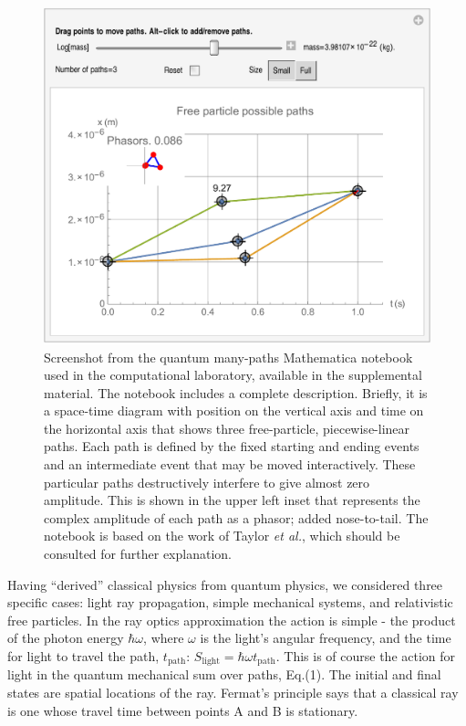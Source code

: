 \documentclass[prb,oncolumn,12pt]{revtex4-2}
\begin{document}
\begin{figure}[]
\includegraphics[width=14cm]{ActionCourseFigure.pdf}
\caption{Screenshot from the quantum many-paths Mathematica notebook used in the computational laboratory, available in the supplemental material. \cite{supplement} The notebook includes a complete description. Briefly, it is a space-time diagram with position on the vertical axis and time on the horizontal axis that shows three free-particle, piecewise-linear paths. Each path is defined by the fixed starting and ending events and an intermediate event that may be moved interactively. These particular paths destructively interfere to give almost zero amplitude. This is shown in the upper left inset that represents the complex amplitude of each path as a phasor; added nose-to-tail. The notebook is based on the work of Taylor \textit{et al.}, \cite{TaylorCIP} which should be consulted for further explanation. }
\label{destructive interference}
\end{figure}

Having ``derived'' classical physics from quantum physics, we considered three specific cases: light ray propagation, simple mechanical systems, and relativistic free particles. In the ray optics approximation the action is simple - the product of the photon energy $\hbar \omega$, where $\omega$ is the light's angular frequency, and the time for light to travel the path, $t_\textrm{path}$: $S_\textrm{light} = \hbar \omega t_\textrm{path}$. This is of course the action for light in the quantum mechanical sum over paths, Eq.(1). The initial and final states are spatial locations of the ray. Fermat's principle says that a classical ray is one whose travel time between points A and B is stationary.
\end{document}
